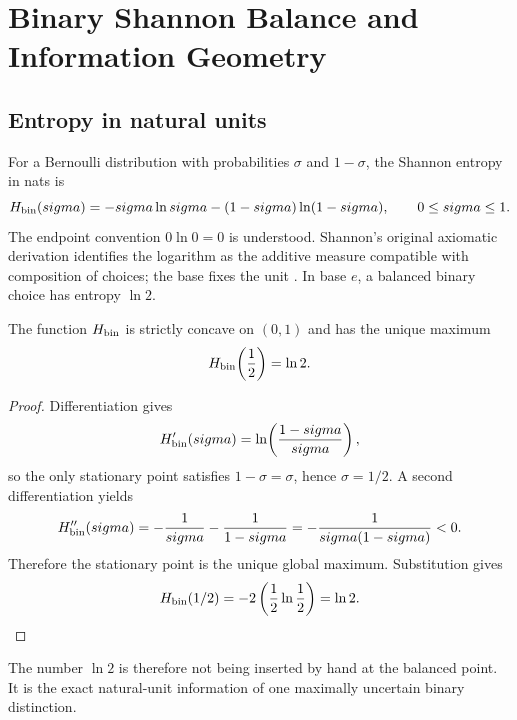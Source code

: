 \chapter{Binary Shannon Balance and Information Geometry}
\label{ch:shannon}

\section{Entropy in natural units}
For a Bernoulli distribution with probabilities $\sigma$ and $1-\sigma$, the Shannon entropy in nats is
\begin{equation}
H_{\mathrm{bin}}(sigma)
=-sigma\ln sigma-(1-sigma)\ln(1-sigma),
\qquad 0\leq sigma\leq1.
\label{eq:binary-entropy}
\end{equation}
The endpoint convention $0\ln0=0$ is understood. Shannon's original axiomatic derivation identifies the logarithm as the additive measure compatible with composition of choices; the base fixes the unit \cite{Shannon1948}. In base $e$, a balanced binary choice has entropy $\ln2$.

\begin{theorem}
The function $H_{\mathrm{bin}}$ is strictly concave on $(0,1)$ and has the unique maximum
\begin{equation}
H_{\mathrm{bin}}\!\left(\frac12\right)=\ln2.
\end{equation}
\end{theorem}

\begin{proof}
Differentiation gives
\begin{equation}
H_{\mathrm{bin}}'(sigma)=\ln\!\left(\frac{1-sigma}{sigma}\right),
\end{equation}
so the only stationary point satisfies $1-\sigma=\sigma$, hence $\sigma=1/2$. A second differentiation yields
\begin{equation}
H_{\mathrm{bin}}''(sigma)
=-\frac1{sigma}-\frac1{1-sigma}
=-\frac{1}{sigma(1-sigma)}<0.
\end{equation}
Therefore the stationary point is the unique global maximum. Substitution gives
\begin{equation}
H_{\mathrm{bin}}(1/2)
=-2\left(\frac12\ln\frac12\right)=\ln2.
\end{equation}
\end{proof}

The number $\ln2$ is therefore not being inserted by hand at the balanced point. It is the exact natural-unit information of one maximally uncertain binary distinction.

